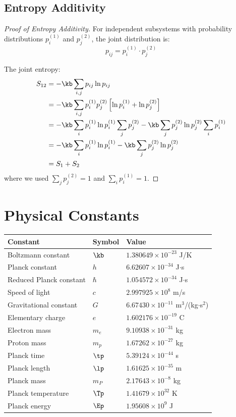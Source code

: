 \subsection{Entropy Additivity}

\begin{proof}[Proof of Entropy Additivity]
For independent subsystems with probability distributions $p_i^{(1)}$ and $p_j^{(2)}$, the joint distribution is:
\begin{equation}
p_{ij} = p_i^{(1)} \cdot p_j^{(2)}
\end{equation}

The joint entropy:
\begin{align}
S_{12} &= -\kb \sum_{i,j} p_{ij} \ln p_{ij} \\
&= -\kb \sum_{i,j} p_i^{(1)} p_j^{(2)} \left[\ln p_i^{(1)} + \ln p_j^{(2)}\right] \\
&= -\kb \sum_i p_i^{(1)} \ln p_i^{(1)} \sum_j p_j^{(2)} - \kb \sum_j p_j^{(2)} \ln p_j^{(2)} \sum_i p_i^{(1)} \\
&= -\kb \sum_i p_i^{(1)} \ln p_i^{(1)} - \kb \sum_j p_j^{(2)} \ln p_j^{(2)} \\
&= S_1 + S_2
\end{align}
where we used $\sum_j p_j^{(2)} = 1$ and $\sum_i p_i^{(1)} = 1$.
\end{proof}

\section{Physical Constants}

\begin{center}
\begin{tabular}{lll}
\toprule
\textbf{Constant} & \textbf{Symbol} & \textbf{Value} \\
\midrule
Boltzmann constant & $\kb$ & $1.380649 \times 10^{-23}$ J/K \\
Planck constant & $h$ & $6.62607 \times 10^{-34}$ J$\cdot$s \\
Reduced Planck constant & $\hbar$ & $1.054572 \times 10^{-34}$ J$\cdot$s \\
Speed of light & $c$ & $2.997925 \times 10^{8}$ m/s \\
Gravitational constant & $G$ & $6.67430 \times 10^{-11}$ m$^3$/(kg$\cdot$s$^2$) \\
Elementary charge & $e$ & $1.602176 \times 10^{-19}$ C \\
Electron mass & $m_e$ & $9.10938 \times 10^{-31}$ kg \\
Proton mass & $m_p$ & $1.67262 \times 10^{-27}$ kg \\
\midrule
Planck time & $\tp$ & $5.39124 \times 10^{-44}$ s \\
Planck length & $\lp$ & $1.61625 \times 10^{-35}$ m \\
Planck mass & $m_P$ & $2.17643 \times 10^{-8}$ kg \\
Planck temperature & $\Tp$ & $1.41679 \times 10^{32}$ K \\
Planck energy & $\Ep$ & $1.95608 \times 10^{9}$ J \\
\bottomrule
\end{tabular}
\end{center}

